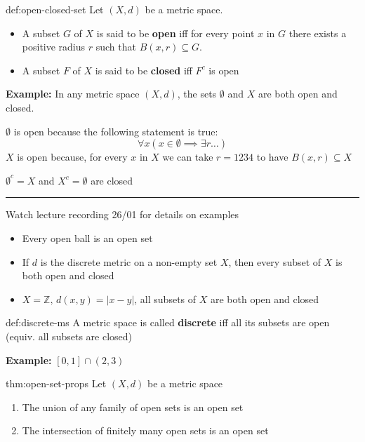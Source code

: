 \documentclass{article}
\begin{document}
\begin{dfn}{def:open-closed-set}{}
    Let $(X,d)$ be a metric space.
    \begin{itemize}
        \item A subset $G$ of $X$ is said to be \textbf{open} iff for every point $x$ in $G$ there exists a positive radius $r$ such that $B(x,r)\subseteq G$.
        \item A subset $F$ of $X$ is said to be \textbf{closed} iff $F^{c}$ is open
    \end{itemize}
\end{dfn}

\textbf{Example:} In any metric space $(X, d)$, the sets $\emptyset$ and $X$ are both open and closed.

$\emptyset$ is open because the following statement is true:
\[\forall x (x\in\emptyset \implies \exists r \dots)\]
$X$ is open because, for every $x$ in $X$ we can take $r = 1234$ to have $B(x,r)\subseteq X$

$\emptyset^{c} = X$ and $X^{c} = \emptyset$ are closed

\noindent\rule{\textwidth}{0.2pt}
Watch lecture recording 26/01 for details on examples
\begin{itemize}
    \item Every open ball is an open set
    \item If $d$ is the discrete metric on a non-empty set $X$, then every subset of $X$ is both open and closed
    \item $X = \mathbb{Z},\,d(x,y) = \lvert x - y \rvert$, all subsets of $X$ are both open and closed
\end{itemize}

\begin{dfn}{def:discrete-ms}{}
    A metric space is called \textbf{discrete} iff all its subsets are open (equiv. all subsets are closed)
\end{dfn}

\textbf{Example:} $[0,1]\cap (2,3)$

\begin{thm}{thm:open-set-props}{}
    Let $(X,d)$ be a metric space
    \begin{enumerate}
        \item The union of any family of open sets is an open set
        \item The intersection of finitely many open sets is an open set
    \end{enumerate}
\end{thm}
\end{document}
